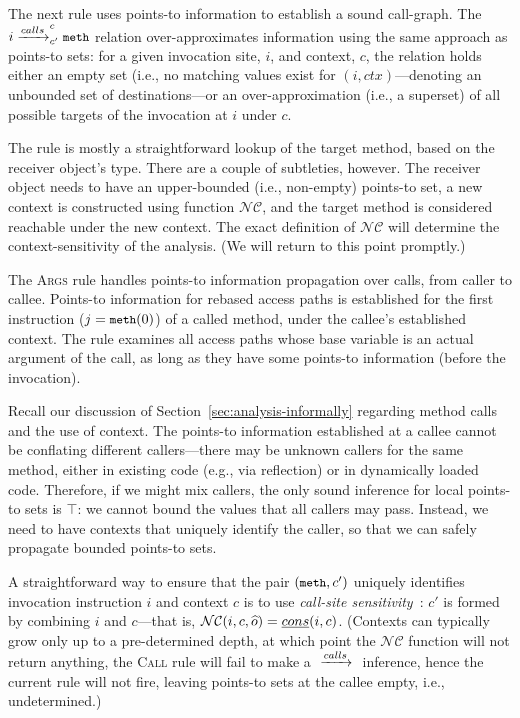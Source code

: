 
The next rule uses points-to information to establish a sound call-graph.
The \({i} \xrightarrow{calls}^{c}_{c'} {{\small {\texttt{meth}}}}\) relation 
over-approximates information using the same approach as points-to
sets: for a given invocation site, \(i\), and context, \(c\),
the relation holds either  an empty set (i.e., no matching values
exist for \((i,ctx)\)---denoting an unbounded set of
destinations---or an over-approximation (i.e., a superset) of all
possible targets of the invocation at \(i\) under \(c\).

The rule is mostly a straightforward lookup of the target method,
based on the receiver object's type. There are a couple of subtleties,
however. The receiver object needs to have an upper-bounded (i.e.,
non-empty) points-to set, a new context is constructed using
function \(\mathcal{NC}\), and the target method is considered reachable
under the new context. The exact definition of \(\mathcal{NC}\)
will determine the context-sensitivity of the analysis. (We will
return to this point promptly.)


The \textsc{Args} rule handles points-to information propagation over
calls, from caller to callee. Points-to information for rebased access
paths is established for the first instruction (\(j = {\small {\texttt{meth}}}(0)\))
  of a called method, under the callee's established context.
  The rule examines all access paths whose base variable is an actual
argument of the call, as long as they have some points-to information
(before the invocation).

Recall our discussion of Section~\ref{sec:analysis-informally}
regarding method calls and the use of context.  The points-to
information established at a callee cannot be conflating different
callers---there may be unknown callers for the same method, either in
existing code (e.g., via reflection) or in dynamically loaded
code. Therefore, if we might mix callers, the only sound inference for
local points-to sets is $\top$: we cannot bound the values that all
callers may pass. Instead, we need to have contexts that uniquely
identify the caller, so that we can safely propagate bounded points-to
sets.

A straightforward way to ensure that the pair \(({\small {\texttt{meth}}},c')\)
uniquely identifies invocation instruction \(i\) and context \(c\)
is to use \emph{call-site sensitivity}~\cite{Sharir:Interprocedural,shivers:thesis}:
\(c'\) is formed by combining \(i\) and \(c\)---that is,
\(\mathcal{NC}(i,c,{\widehat{o}}) = \emph{cons}(i,c)\).
(Contexts can typically
grow only up to a pre-determined depth, at which point the
\(\mathcal{NC}\) function will not return anything, the \textsc{Call}
rule will fail to make a \({} \xrightarrow{calls}^{}_{} {}\) inference, hence the
current rule will not fire, leaving points-to sets at the callee
empty, i.e., undetermined.)


